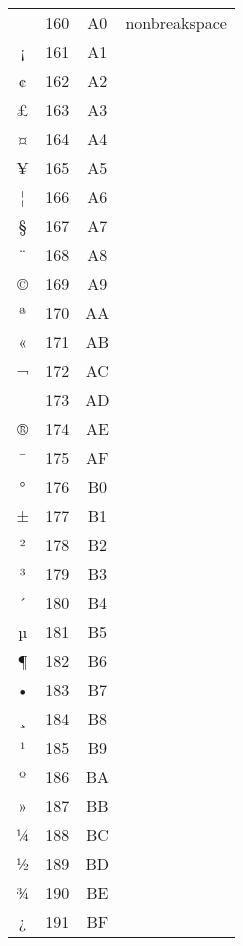 \documentclass[10pt]{article}
\begin{document}
\begin{tabular}{crcl}
 &160&A0&nonbreakspace\\
¡&161&A1&\\
¢&162&A2&\\
£&163&A3&\\
¤&164&A4&\\
¥&165&A5&\\
¦&166&A6&\\
§&167&A7&\\
¨&168&A8&\\
©&169&A9&\\
ª&170&AA&\\
«&171&AB&\\
¬&172&AC&\\
­&173&AD&\\
®&174&AE&\\
¯&175&AF&\\
°&176&B0&\\
±&177&B1&\\
²&178&B2&\\
³&179&B3&\\
´&180&B4&\\
µ&181&B5&\\
¶&182&B6&\\
•&183&B7&\\
¸&184&B8&\\
¹&185&B9&\\
º&186&BA&\\
»&187&BB&\\
¼&188&BC&\\
½&189&BD&\\
¾&190&BE&\\
¿&191&BF&\\
\end{tabular}
\end{document}
